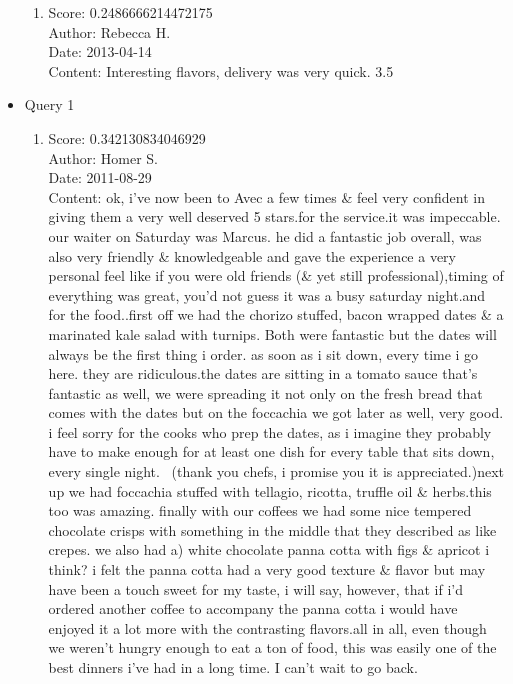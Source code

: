 \documentclass[paper=a4, fontsize=11pt]{jhwhw} %
\begin{document}
\begin{itemize}
\begin{enumerate}
            \item Score: 0.2486666214472175\\
                Author: Rebecca H.\\
                Date: 2013-04-14\\
                Content: Interesting flavors, delivery was very quick. 3.5
        \end{enumerate}
    \item Query 1
        \begin{enumerate}
            \item Score: 0.342130834046929\\
                Author: Homer S.\\
                Date: 2011-08-29\\
                Content: ok, i've now been to Avec a few times \& feel very confident in giving them a very well deserved 5 stars.for the service.it was impeccable. our waiter on Saturday was Marcus. he did a fantastic job overall, was also very friendly \& knowledgeable and gave the experience a very personal feel like if you were old friends (\& yet still professional),timing of everything was great, you'd not guess it was a busy saturday night.and for the food..first off we had the chorizo stuffed, bacon wrapped dates \& a marinated kale salad with turnips. Both were fantastic but the dates will always be the first thing i order. as soon as i sit down, every time i go here. they are ridiculous.the dates are sitting in a tomato sauce that's fantastic as well, we were spreading it not only on the fresh bread that comes with the dates but on the foccachia we got later as well, very good. i feel sorry for the cooks who prep the dates, as i imagine they probably have to make enough for at least one dish for every table that sits down, every single night.  (thank you chefs, i promise you it is appreciated.)next up we had foccachia stuffed with tellagio, ricotta, truffle oil \& herbs.this too was amazing. finally with our coffees we had some nice tempered chocolate crisps with something in the middle that they described as like crepes. we also had a) white chocolate panna cotta with figs \& apricot i think? i felt the panna cotta had a very good texture \& flavor but may have been a touch sweet for my taste, i will say, however, that if i'd ordered another coffee to accompany the panna cotta i would have enjoyed it a lot more with the contrasting flavors.all in all, even though we weren't hungry enough to eat a ton of food, this was easily one of the best dinners i've had in a long time. I can't wait to go back.

\end{enumerate}
\end{itemize}
\end{document}
